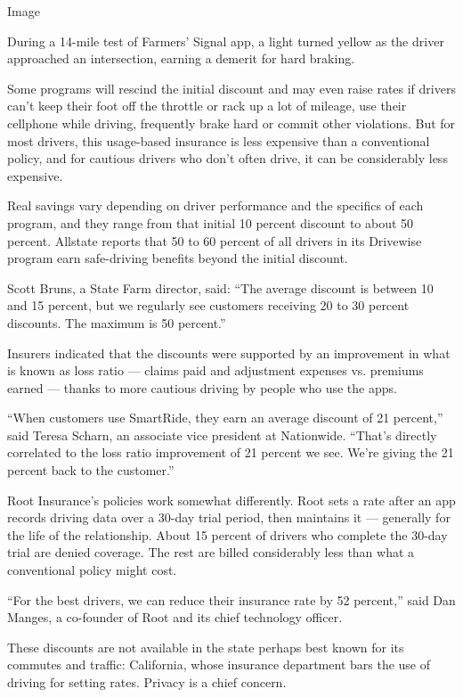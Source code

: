 Image

During a 14-mile test of Farmers' Signal app, a light turned yellow as
the driver approached an intersection, earning a demerit for hard
braking.

Some programs will rescind the initial discount and may even raise rates
if drivers can't keep their foot off the throttle or rack up a lot of
mileage, use their cellphone while driving, frequently brake hard or
commit other violations. But for most drivers, this usage-based
insurance is less expensive than a conventional policy, and for cautious
drivers who don't often drive, it can be considerably less expensive.

Real savings vary depending on driver performance and the specifics of
each program, and they range from that initial 10 percent discount to
about 50 percent. Allstate reports that 50 to 60 percent of all drivers
in its Drivewise program earn safe-driving benefits beyond the initial
discount.

Scott Bruns, a State Farm director, said: ``The average discount is
between 10 and 15 percent, but we regularly see customers receiving 20
to 30 percent discounts. The maximum is 50 percent.''

Insurers indicated that the discounts were supported by an improvement
in what is known as loss ratio --- claims paid and adjustment expenses
vs. premiums earned --- thanks to more cautious driving by people who
use the apps.

``When customers use SmartRide, they earn an average discount of 21
percent,'' said Teresa Scharn, an associate vice president at
Nationwide. ``That's directly correlated to the loss ratio improvement
of 21 percent we see. We're giving the 21 percent back to the
customer.''

Root Insurance's policies work somewhat differently. Root sets a rate
after an app records driving data over a 30-day trial period, then
maintains it --- generally for the life of the relationship. About 15
percent of drivers who complete the 30-day trial are denied coverage.
The rest are billed considerably less than what a conventional policy
might cost.

``For the best drivers, we can reduce their insurance rate by 52
percent,'' said Dan Manges, a co-founder of Root and its chief
technology officer.

These discounts are not available in the state perhaps best known for
its commutes and traffic: California, whose insurance department bars
the use of driving for setting rates. Privacy is a chief concern.

